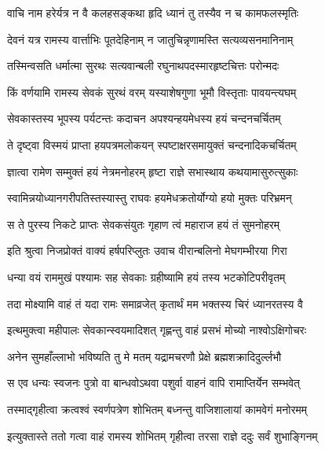\twolineshloka
{वाचि नाम हरेर्यत्र न वै कलहसङ्कथा}
{हृदि ध्यानं तु तस्यैव न च कामफलस्मृतिः}%

\twolineshloka
{देवनं यत्र रामस्य वार्त्ताभिः पूतदेहिनाम्}
{न जातुचिन्नृणामस्ति सत्यव्यसनमानिनाम्}%

\twolineshloka
{तस्मिन्वसति धर्मात्मा सुरथः सत्यवान्बली}
{रघुनाथपदस्मारहृष्टचित्तः परोन्मदः}%

\twolineshloka
{किं वर्णयामि रामस्य सेवकं सुरथं वरम्}
{यस्याशेषगुणा भूमौ विस्तृताः पावयन्त्यघम्}%

\twolineshloka
{सेवकास्तस्य भूपस्य पर्यटन्तः कदाचन}
{अपश्यन्हयमेधस्य हयं चन्दनचर्चितम्}%

\twolineshloka
{ते दृष्ट्वा विस्मयं प्राप्ता हयपत्रमलोकयन्}
{स्पष्टाक्षरसमायुक्तं चन्दनादिकचर्चितम्}%

\twolineshloka
{ज्ञात्वा रामेण सम्मुक्तं हयं नेत्रमनोहरम्}
{हृष्टा राज्ञे सभास्थाय कथयामासुरुत्सुकाः}%

\twolineshloka
{स्वामिन्नयोध्यानगरीपतिस्तस्यास्तु राघवः}
{हयमेधक्रतोर्योग्यो हयो मुक्तः परिभ्रमन्}%

\twolineshloka
{स ते पुरस्य निकटे प्राप्तः सेवकसंयुतः}
{गृहाण त्वं महाराज हयं तं सुमनोहरम्}%


\twolineshloka
{इति श्रुत्वा निजप्रोक्तं वाक्यं हर्षपरिप्लुतः}
{उवाच वीरान्बलिनो मेघगम्भीरया गिरा}%


\twolineshloka
{धन्या वयं राममुखं पश्यामः सह सेवकाः}
{ग्रहीष्यामि हयं तस्य भटकोटिपरीवृतम्}%

\twolineshloka
{तदा मोक्ष्यामि वाहं तं यदा रामः समाव्रजेत्}
{कृतार्थं मम भक्तस्य चिरं ध्यानरतस्य वै}%


\twolineshloka
{इत्थमुक्त्वा महीपालः सेवकान्स्वयमादिशत्}
{गृह्णन्तु वाहं प्रसभं मोच्यो नाश्वोऽक्षिगोचरः}%

\twolineshloka
{अनेन सुमहाँल्लाभो भविष्यति तु मे मतम्}
{यद्रामचरणौ प्रेक्षे ब्रह्मशक्रादिदुर्ल्लभौ}%

\twolineshloka
{स एव धन्यः स्वजनः पुत्रो वा बान्धवोऽथवा}
{पशुर्वा वाहनं वापि रामाप्तिर्येन सम्भवेत्}%

\twolineshloka
{तस्माद्गृहीत्वा क्रत्वश्वं स्वर्णपत्रेण शोभितम्}
{बध्नन्तु वाजिशालायां कामवेगं मनोरमम्}%

\twolineshloka
{इत्युक्तास्ते ततो गत्वा वाहं रामस्य शोभितम्}
{गृहीत्वा तरसा राज्ञे ददुः सर्वं शुभाङ्गिनम्}%

